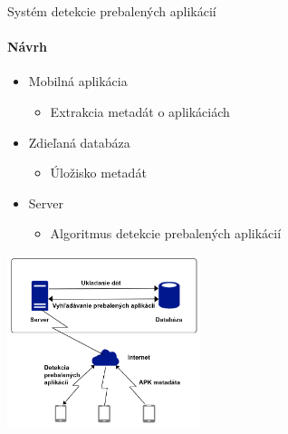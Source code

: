 \documentclass{beamer}
\begin{document}
  \begin{frame}[label=lists]{Systém detekcie prebalených aplikácií}
 	 \framesubtitle{Návrh}
 	 \begin{minipage}[htb]{\textwidth}
		\begin{minipage}[t]{0.45\textwidth}
				\begin{itemize}
		\item Mobilná aplikácia
			\begin{itemize}
				\item Extrakcia metadát o aplikáciách
			\end{itemize}
		\item Zdieľaná databáza
			\begin{itemize}
				\item Úložisko metadát
			\end{itemize}		
		\item Server
			\begin{itemize}
				\item Algoritmus detekcie prebalených aplikácií
			\end{itemize}					
	\end{itemize}
		\end{minipage}%
	\hfill
	\centering
		\begin{minipage}[t][][b]{0.55\textwidth}
		\centering
    		\includegraphics[height=5cm]{images/system-overview.png}
		\label{fig:app-list}
		\end{minipage}%
	\end{minipage}
  \end{frame}  	
  
\end{document}
